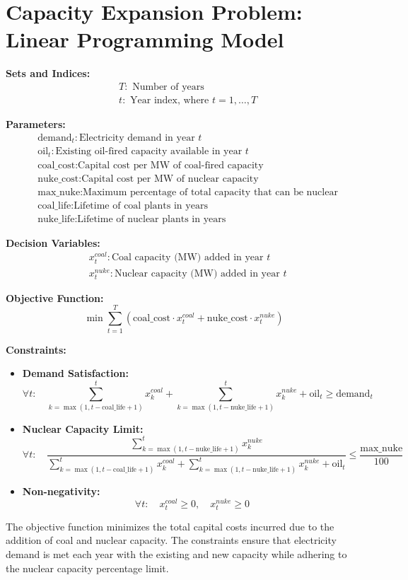 \documentclass{article}
\begin{document}
\section*{Capacity Expansion Problem: Linear Programming Model}

\noindent \textbf{Sets and Indices:}
\begin{align*}
    &T: \text{ Number of years} \\
    &t: \text{ Year index, where } t = 1, \ldots, T
\end{align*}

\noindent \textbf{Parameters:}
\begin{align*}
    &\text{demand}_t: \text{Electricity demand in year } t \\
    &\text{oil}_t: \text{Existing oil-fired capacity available in year } t \\
    &\text{coal\_cost}: \text{Capital cost per MW of coal-fired capacity} \\
    &\text{nuke\_cost}: \text{Capital cost per MW of nuclear capacity} \\
    &\text{max\_nuke}: \text{Maximum percentage of total capacity that can be nuclear} \\
    &\text{coal\_life}: \text{Lifetime of coal plants in years} \\
    &\text{nuke\_life}: \text{Lifetime of nuclear plants in years}
\end{align*}

\noindent \textbf{Decision Variables:}
\begin{align*}
    &x_t^{coal}: \text{Coal capacity (MW) added in year } t \\
    &x_t^{nuke}: \text{Nuclear capacity (MW) added in year } t
\end{align*}

\noindent \textbf{Objective Function:}
\[
    \min \sum_{t=1}^{T} \left( \text{coal\_cost} \cdot x_t^{coal} + \text{nuke\_cost} \cdot x_t^{nuke} \right)
\]

\noindent \textbf{Constraints:}

\begin{itemize}
    \item \textbf{Demand Satisfaction:}
    \[
    \forall t: \quad \sum_{k=\max(1, t-\text{coal\_life}+1)}^{t} x_k^{coal} + \sum_{k=\max(1, t-\text{nuke\_life}+1)}^{t} x_k^{nuke} + \text{oil}_t \geq \text{demand}_t 
    \]

    \item \textbf{Nuclear Capacity Limit:}
    \[
    \forall t: \quad \frac{\sum_{k=\max(1, t-\text{nuke\_life}+1)}^{t} x_k^{nuke}}{\sum_{k=\max(1, t-\text{coal\_life}+1)}^{t} x_k^{coal} + \sum_{k=\max(1, t-\text{nuke\_life}+1)}^{t} x_k^{nuke} + \text{oil}_t} \leq \frac{\text{max\_nuke}}{100}
    \]

    \item \textbf{Non-negativity:}
    \[
    \forall t: \quad x_t^{coal} \geq 0, \quad x_t^{nuke} \geq 0
    \]
\end{itemize}

\noindent The objective function minimizes the total capital costs incurred due to the addition of coal and nuclear capacity. The constraints ensure that electricity demand is met each year with the existing and new capacity while adhering to the nuclear capacity percentage limit.
\end{document}
